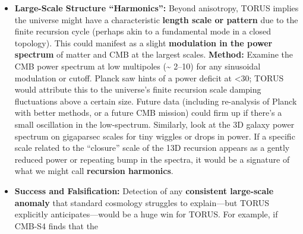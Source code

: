 \documentclass[
]{article}
\begin{document}
{\begin{itemize}
\begin{itemize}
    clustering or flows, and see if it matches the CMB's anomalous axis.
    Also compute the cross-correlation between the CMB temperature
    fluctuations and the density of distant galaxies on large scales.
    TORUS would predict a \textbf{correlation between the CMB
    ``hot/cold'' spots and the pattern of matter distribution} if both
    are influenced by the same recursion geometry\hspace{0pt}. For
    instance, the plane along which the CMB quadrupole is weakest might
    be the plane dividing a slightly higher-density half of the local
    universe from a lower-density half\hspace{0pt}. If analyses find
    that the CMB's weird features have a counterpart in galaxy data (a
    very specific, unlikely coincidence under random isotropy), that
    would strongly point to a common cause like TORUS's toroidal
    universe model\hspace{0pt}.
  \item
    \textbf{Large-Scale Structure ``Harmonics'':} Beyond anisotropy,
    TORUS implies the universe might have a characteristic
    \textbf{length scale or pattern} due to the finite recursion cycle
    (perhaps akin to a fundamental mode in a closed topology). This
    could manifest as a slight \textbf{modulation in the power spectrum}
    of matter and CMB at the largest scales. \textbf{Method:} Examine
    the CMB power spectrum at low multipoles (\ell \textasciitilde{} 2--10)
    for any sinusoidal modulation or cutoff. Planck saw hints of a power
    deficit at \ell\textless30; TORUS would attribute this to the
    universe's finite recursion scale damping fluctuations above a
    certain size\hspace{0pt}. Future data (including re-analysis of
    Planck with better methods, or a future CMB mission) could firm up
    if there's a small oscillation in the low-\ell spectrum. Similarly,
    look at the 3D galaxy power spectrum on gigaparsec scales for tiny
    wiggles or drops in power. If a specific scale related to the
    ``closure'' scale of the 13D recursion appears as a gently reduced
    power or repeating bump in the spectra, it would be a signature of
    what we might call \textbf{recursion harmonics}\hspace{0pt}.
  \item
    \textbf{Success and Falsification:} Detection of any
    \textbf{consistent large-scale anomaly} that standard cosmology
    struggles to explain---but TORUS explicitly anticipates---would be a
    huge win for TORUS. For example, if CMB-S4 finds that the

\end{itemize}
\end{itemize}}
\end{document}

